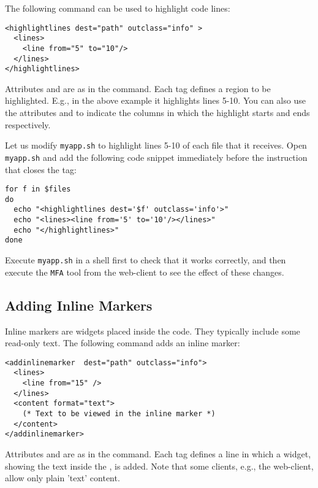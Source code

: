 The following command can be used to highlight code lines:

\medskip
\begin{lstlisting}
<highlightlines dest="path" outclass="info" > 
  <lines>
    <line from="5" to="10"/>
  </lines>
</highlightlines>
\end{lstlisting}

\medskip
\noindent
Attributes  and  are as in the 
command. Each  tag defines a region to be highlighted. E.g.,
in the above example it highlights lines 5-10. You can also use the
attributes  and  to indicate the columns in
which the highlight starts and ends respectively.

Let us modify \texttt{myapp.sh} to highlight lines 5-10 of each file
that it receives. Open \texttt{myapp.sh} and add the following code
snippet immediately before the instruction that closes the
 tag:

\medskip
\begin{lstlisting}[style=script]
for f in $files 
do
  echo "<highlightlines dest='$f' outclass='info'>"
  echo "<lines><line from='5' to='10'/></lines>"
  echo "</highlightlines>"
done
\end{lstlisting}

\medskip
\noindent
Execute \texttt{myapp.sh} in a shell first to check that it works
correctly, and then execute the \texttt{MFA} tool from the
web-client to see the effect of these changes.

\subsection{Adding Inline Markers}

Inline markers are widgets placed inside the code. They typically
include some read-only text. The following command adds an inline
marker:

\medskip
\begin{lstlisting}
<addinlinemarker  dest="path" outclass="info"> 
  <lines>
    <line from="15" />
  </lines>
  <content format="text">
    (* Text to be viewed in the inline marker *)
  </content>
</addinlinemarker>
\end{lstlisting}

\medskip
\noindent
Attributes  and  are as in the 
command. Each  tag defines a line in which a widget, showing
the text inside the , is added. Note that some clients,
e.g., the web-client, allow only plain 'text' content.

